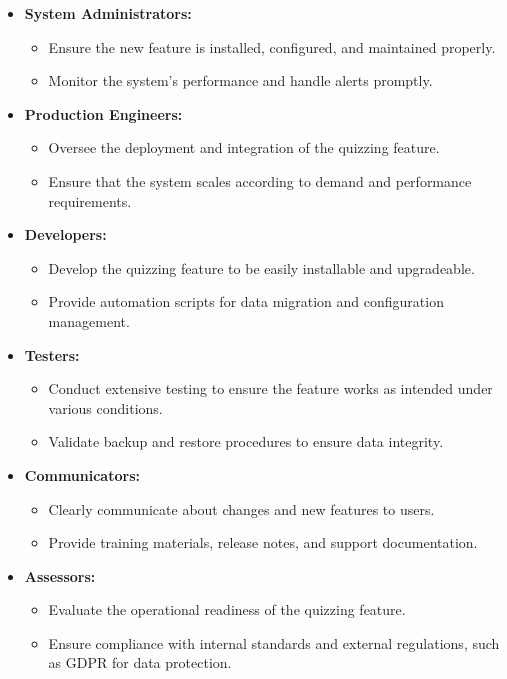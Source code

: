 \begin{itemize}
    \item \textbf{System Administrators:}
          \begin{itemize}
              \item Ensure the new feature is installed, configured, and maintained properly.
              \item Monitor the system's performance and handle alerts promptly.
          \end{itemize}
    \item \textbf{Production Engineers:}
          \begin{itemize}
              \item Oversee the deployment and integration of the quizzing feature.
              \item Ensure that the system scales according to demand and performance requirements.
          \end{itemize}
    \item \textbf{Developers:}
          \begin{itemize}
              \item Develop the quizzing feature to be easily installable and upgradeable.
              \item Provide automation scripts for data migration and configuration management.
          \end{itemize}
    \item \textbf{Testers:}
          \begin{itemize}
              \item Conduct extensive testing to ensure the feature works as intended under various conditions.
              \item Validate backup and restore procedures to ensure data integrity.
          \end{itemize}
    \item \textbf{Communicators:}
          \begin{itemize}
              \item Clearly communicate about changes and new features to users.
              \item Provide training materials, release notes, and support documentation.
          \end{itemize}
    \item \textbf{Assessors:}
          \begin{itemize}
              \item Evaluate the operational readiness of the quizzing feature.
              \item Ensure compliance with internal standards and external regulations, such as GDPR for data protection.
          \end{itemize}
\end{itemize}



